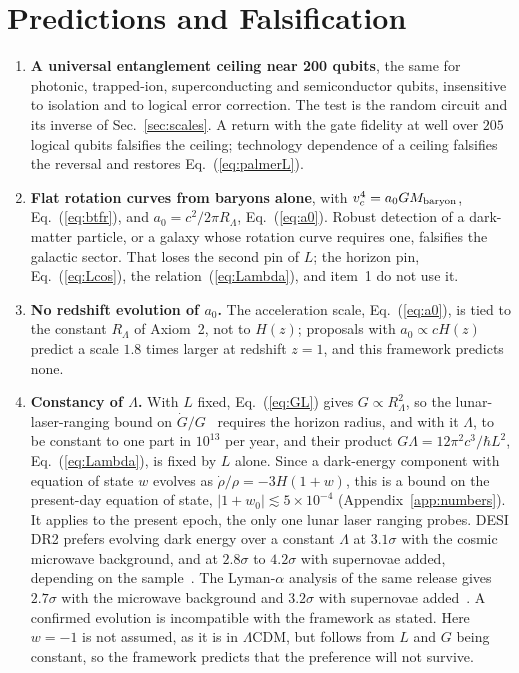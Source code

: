 \documentclass[aps,prd,twocolumn,superscriptaddress,nofootinbib,showkeys]{revtex4-2}
\begin{document}
\section{Predictions and Falsification}
\label{sec:predictions}

\begin{enumerate}
\item \textbf{A universal entanglement ceiling near 200 qubits}, the same for photonic, trapped-ion, superconducting and semiconductor qubits, insensitive to isolation and to logical error correction. The test is the random circuit and its inverse of Sec.~\ref{sec:scales}. A return with the gate fidelity at well over $205$ logical qubits falsifies the ceiling; technology dependence of a ceiling falsifies the reversal and restores Eq.~(\ref{eq:palmerL}).
\item \textbf{Flat rotation curves from baryons alone}, with $v_c^4 = a_0 G M_{\rm baryon}$, Eq.~(\ref{eq:btfr}), and $a_0 = c^2/2\pi R_\Lambda$, Eq.~(\ref{eq:a0}). Robust detection of a dark-matter particle, or a galaxy whose rotation curve requires one, falsifies the galactic sector. That loses the second pin of $L$; the horizon pin, Eq.~(\ref{eq:Lcos}), the relation~(\ref{eq:Lambda}), and item~1 do not use it.
\item {\boldmath\textbf{No redshift evolution of $a_0$.}} The acceleration scale, Eq.~(\ref{eq:a0}), is tied to the constant $R_\Lambda$ of Axiom~2, not to $H(z)$; proposals with $a_0\propto cH(z)$ predict a scale $1.8$ times larger at redshift $z=1$, and this framework predicts none.
\item {\boldmath\textbf{Constancy of $\Lambda$.}} With $L$ fixed, Eq.~(\ref{eq:GL}) gives $G\propto R_\Lambda^2$, so the lunar-laser-ranging bound on $\dot G/G$~\cite{hofmann2018} requires the horizon radius, and with it $\Lambda$, to be constant to one part in $10^{13}$ per year, and their product $G\Lambda = 12\pi^2c^3/\hbar L^2$, Eq.~(\ref{eq:Lambda}), is fixed by $L$ alone. Since a dark-energy component with equation of state $w$ evolves as $\dot\rho/\rho = -3H(1+w)$, this is a bound on the present-day equation of state, $|1+w_0| \lesssim 5\times10^{-4}$ (Appendix~\ref{app:numbers}). It applies to the present epoch, the only one lunar laser ranging probes. DESI DR2 prefers evolving dark energy over a constant $\Lambda$ at $3.1\sigma$ with the cosmic microwave background, and at $2.8\sigma$ to $4.2\sigma$ with supernovae added, depending on the sample~\cite{desi2025}. The Lyman-$\alpha$ analysis of the same release gives $2.7\sigma$ with the microwave background and $3.2\sigma$ with supernovae added~\cite{desi2026}. A confirmed evolution is incompatible with the framework as stated. Here $w=-1$ is not assumed, as it is in $\Lambda$CDM, but follows from $L$ and $G$ being constant, so the framework predicts that the preference will not survive.
\end{enumerate}
\end{document}
